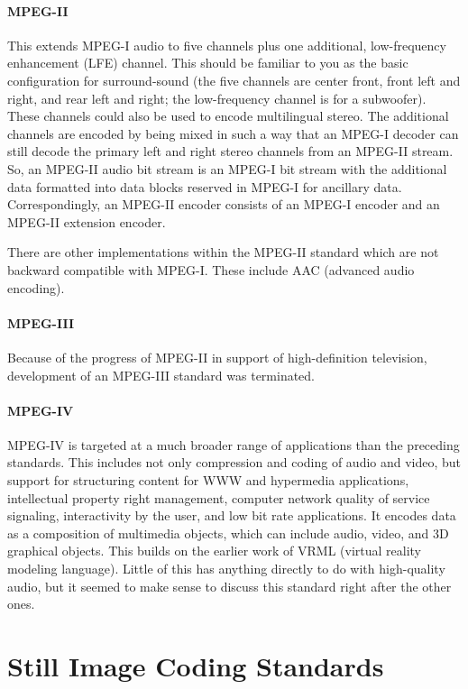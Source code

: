 \paragraph*{MPEG-II}
This extends MPEG-I audio to five channels plus one additional,
low-frequency enhancement (LFE) channel. This should be familiar to
you as the basic configuration for surround-sound (the five channels
are center front, front left and right, and rear left and right; the
low-frequency channel is for a subwoofer).  These channels could also
be used to encode multilingual stereo.  The additional channels are
encoded by being mixed in such a way that an MPEG-I decoder can still
decode the primary left and right stereo channels from an MPEG-II
stream. So, an MPEG-II audio bit stream is an MPEG-I bit stream with
the additional data formatted into data blocks reserved in MPEG-I
for ancillary data. Correspondingly, an MPEG-II encoder consists of
an MPEG-I encoder and an MPEG-II extension encoder.

There are other implementations within the MPEG-II standard which are
not backward compatible with MPEG-I. These include AAC (advanced audio 
encoding).

\paragraph*{MPEG-III}
Because of the progress of MPEG-II in support of high-definition
television, development of an MPEG-III standard was terminated.

\paragraph*{MPEG-IV}
MPEG-IV is targeted at a much broader range of applications than the
preceding standards.  This includes not only compression and coding of 
audio and video, but support for structuring content for WWW and
hypermedia applications, intellectual property right management,
computer network quality of service signaling, interactivity by the
user, and low bit rate applications. It encodes data as a composition
of multimedia objects, which can include audio, video, and 3D
graphical objects.  This builds on the earlier work of VRML (virtual
reality modeling language). Little of this has anything directly to do 
with high-quality audio, but it seemed to make sense to discuss this
standard right after the other ones.

\section{Still Image Coding Standards}

